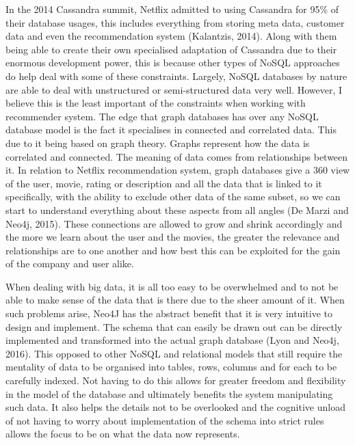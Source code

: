 \documentclass[a4paper]{article}
\begin{document}
In the 2014 Cassandra summit, Netflix admitted to using Cassandra for 95\% of their database usages, this includes everything from storing meta data, customer data and even the recommendation system (Kalantzis, 2014). Along with them being able to create their own specialised adaptation of Cassandra due to their enormous development power, this is because other types of NoSQL approaches do help deal with some of these constraints. Largely, NoSQL databases by nature are able to deal with unstructured or semi-structured data very well. However, I believe this is the least important of the constraints when working with recommender system. The edge that graph databases has over any NoSQL database model is the fact it specialises in connected and correlated data. This due to it being based on graph theory. Graphs represent how the data is correlated and connected. The meaning of data comes from relationships between it. In relation to Netflix recommendation system, graph databases give a 360 view of the user, movie, rating or description and all the data that is linked to it specifically, with the ability to exclude other data of the same subset, so we can start to understand everything about these aspects from all angles (De Marzi and Neo4j, 2015). These connections are allowed to grow and shrink accordingly and the more we learn about the user and the movies, the greater the relevance and relationships are to one another and how best this can be exploited for the gain of the company and user alike. \par

When dealing with big data, it is all too easy to be overwhelmed and to not be able to make sense of the data that is there due to the sheer amount of it. When such problems arise, Neo4J has the abstract benefit that it is very intuitive to design and implement. The schema that can easily be drawn out can be directly implemented and transformed into the actual graph database (Lyon and Neo4j, 2016). This opposed to other NoSQL and relational models that still require the mentality of data to be organised into tables, rows, columns and for each to be carefully indexed. Not having to do this allows for greater freedom and flexibility in the model of the database and ultimately benefits the system manipulating such data. It also helps the details not to be overlooked and the cognitive unload of not having to worry about implementation of the schema into strict rules allows the focus to be on what the data now represents.\par
\end{document}
